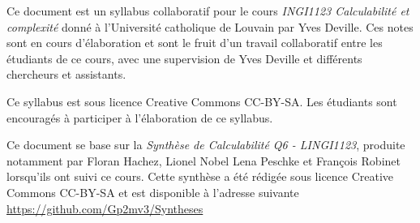 
Ce document est un syllabus collaboratif pour le cours \emph{INGI1123 Calculabilité et complexité}  donné à l'Université catholique de Louvain par Yves Deville.  Ces notes sont en cours d'élaboration et sont le fruit d'un travail collaboratif entre les étudiants de ce cours, avec une supervision de Yves Deville et différents chercheurs et assistants.

Ce syllabus est sous licence Creative Commons CC-BY-SA.  Les étudiants sont encouragés à participer à l'élaboration de ce syllabus.  

Ce document se base sur la \emph{Synthèse de Calculabilité Q6 - LINGI1123}, produite notamment par Floran Hachez, Lionel Nobel Lena Peschke et François Robinet lorsqu'ils ont suivi ce cours.  Cette synthèse a été rédigée sous licence Creative Commons CC-BY-SA et est disponible à l’adresse suivante
\url{https://github.com/Gp2mv3/Syntheses}



